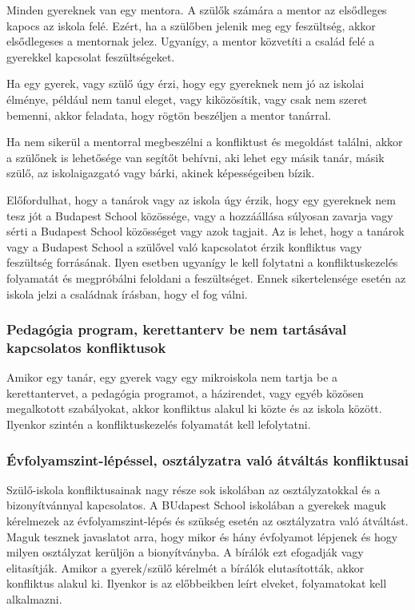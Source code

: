 Minden gyereknek van egy mentora. A szülők számára a mentor az
elsődleges kapocs az iskola felé. Ezért, ha a szülőben jelenik meg egy
feszültség, akkor elsődlegeses a mentornak jelez. Ugyanígy, a mentor
közvetíti a család felé a gyerekkel kapcsolat feszültségeket.

Ha egy gyerek, vagy szülő úgy érzi, hogy egy gyereknek nem jó az iskolai
élménye, például nem tanul eleget, vagy kiközösítik, vagy csak nem
szeret bemenni, akkor feladata, hogy rögtön beszéljen a mentor tanárral.

Ha nem sikerül a mentorral megbeszélni a konfliktust és megoldást találni,
akkor a szülőnek is lehetősége van segítőt behívni, aki lehet egy másik tanár,
másik szülő, az iskolaigazgató vagy bárki, akinek képességeiben bízik.

Előfordulhat, hogy a tanárok vagy az iskola úgy érzik, hogy egy
gyereknek nem tesz jót a Budapest School közössége, vagy a hozzáállása
súlyosan zavarja vagy sérti a Budapest School közösséget vagy azok
tagjait. Az is lehet, hogy a tanárok vagy a Budapest School a szülővel
való kapcsolatot érzik konfliktus vagy feszültség forrásának. Ilyen
esetben ugyanígy le kell folytatni a konfliktuskezelés folyamatát és
megpróbálni feloldani a feszültséget. Ennek sikertelensége esetén az
iskola jelzi a családnak írásban, hogy el fog válni.

\subsubsection{Pedagógia program, kerettanterv be nem tartásával
    kapcsolatos konfliktusok}

Amikor egy tanár, egy gyerek vagy egy mikroiskola nem tartja be a
kerettantervet, a pedagógia programot, a házirendet, vagy egyéb közösen
megalkotott szabályokat, akkor konfliktus alakul ki közte és az iskola
között. Ilyenkor szintén a konfliktuskezelés folyamatát kell
lefolytatni.

\subsubsection{Évfolyamszint-lépéssel, osztályzatra való átváltás konfliktusai}
Szülő-iskola konfliktusainak nagy része sok iskolában az osztályzatokkal és a
bizonyítvánnyal kapcsolatos.
A BUdapest School iskolában a gyerekek maguk kérelmezek az évfolyamszint-lépés
és szükség esetén az osztályzatra való átváltást. Maguk tesznek javaslatot
arra, hogy mikor és hány évfolyamot lépjenek és hogy milyen osztályzat kerüljön
a bionyítványba. A bírálók ezt efogadják vagy elitasítják. Amikor a
gyerek/szülő kérelmét a bírálók elutasították, akkor konfliktus alakul ki.
Ilyenkor is az előbbeikben leírt elveket, folyamatokat kell alkalmazni.